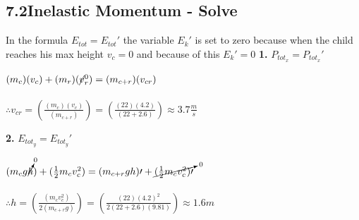 \subsection*{7.2\hspace*{0.5cm}Inelastic Momentum - Solve}
In the formula $E_{tot} = E_{tot}\prime$ the variable $E_{k}\prime$ is set to zero because when the child reaches his max height $v_{c} = 0$ and because of this $E_{k}\prime = 0$\newline\newline
\textbf{1.} $P_{tot_{x}} = P_{tot_{x}}\prime$ \\
\begin{adjustwidth}{0.6cm}{0pt}
    $(m_{c})({v}_{c}) + (m_{r})(\cancel{v}_{r}^0) = (m_{c + r})(v_{cr})$ \\\\
    $\therefore v_{cr} = \left(\frac{(m_{c})(v_{c})}{(m_{c + r})}\right) = \left(\frac{(22)(4.2)}{(22 + 2.6)}\right) \approx 3.7\frac{m}{s}$
\end{adjustwidth}\vspace*{15pt}
\textbf{2.} $E_{tot_{y}} = E_{tot_{y}}\prime$ \\
\begin{adjustwidth}{0.6cm}{0pt}
    $(m_{c}g\cancelto{0}{h}) + (\frac{1}{2}m_{c}v_{c}^2) = (m_{c + r}gh)\prime + \cancelto{0}{(\frac{1}{2}m_{c}v_{c}^2)\prime}$ \\\\
    $\therefore h = \left(\frac{(m_{c}v_{c}^2)}{2(m_{c+r}g)}\right) = \left(\frac{(22){(4.2)}^2}{2(22 + 2.6)(9.81)}\right) \approx 1.6m$
\end{adjustwidth}\vspace*{15pt}